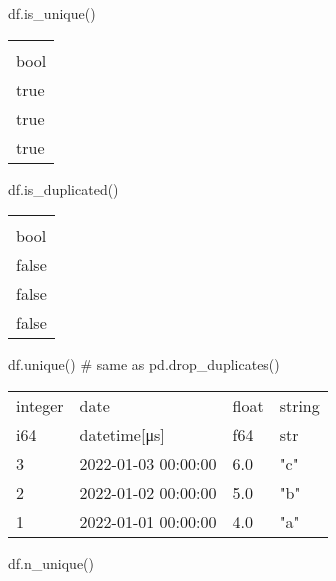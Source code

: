 \documentclass[
  letterpaper,
  DIV=11,
  numbers=noendperiod]{scrartcl}
\newenvironment{Shaded}{\begin{snugshade}}{\end{snugshade}}
\newcommand{\CommentTok}[1]{\textcolor[rgb]{0.37,0.37,0.37}{#1}}
\newcommand{\NormalTok}[1]{\textcolor[rgb]{0.00,0.23,0.31}{#1}}
\begin{document}
\begin{Shaded}
\begin{Highlighting}[]
\NormalTok{df.is\_unique()}
\end{Highlighting}
\end{Shaded}

\begin{longtable}[]{@{}l@{}}
\toprule()
 \\
bool \\
\midrule()
\endhead
true \\
true \\
true \\
\bottomrule()
\end{longtable}

\begin{Shaded}
\begin{Highlighting}[]
\NormalTok{df.is\_duplicated()}
\end{Highlighting}
\end{Shaded}

\begin{longtable}[]{@{}l@{}}
\toprule()
 \\
bool \\
\midrule()
\endhead
false \\
false \\
false \\
\bottomrule()
\end{longtable}

\begin{Shaded}
\begin{Highlighting}[]
\NormalTok{df.unique() }\CommentTok{\# same as pd.drop\_duplicates()}
\end{Highlighting}
\end{Shaded}

\begin{longtable}[]{@{}llll@{}}
\toprule()
integer & date & float & string \\
i64 & datetime{[}μs{]} & f64 & str \\
\midrule()
\endhead
3 & 2022-01-03 00:00:00 & 6.0 & "c" \\
2 & 2022-01-02 00:00:00 & 5.0 & "b" \\
1 & 2022-01-01 00:00:00 & 4.0 & "a" \\
\bottomrule()
\end{longtable}

\begin{Shaded}
\begin{Highlighting}[]
\NormalTok{df.n\_unique()}
\end{Highlighting}
\end{Shaded}
\end{document}
